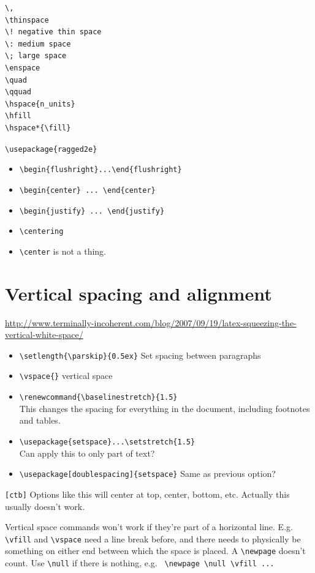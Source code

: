 \documentclass{article}
\begin{document}
\begin{verbatim}
\,
\thinspace
\! negative thin space
\: medium space
\; large space
\enspace
\quad
\qquad
\hspace{n_units}
\hfill
\hspace*{\fill}
\end{verbatim}

\verb|\usepackage{ragged2e}|
\begin{itemize}
    \item \verb|\begin{flushright}...\end{flushright}|
    \item \verb|\begin{center} ... \end{center}|
    \item \verb|\begin{justify} ... \end{justify}|
    \item \verb|\centering|
    \item \verb|\center| is not a thing.
\end{itemize}

\section{Vertical spacing and alignment}
\url{http://www.terminally-incoherent.com/blog/2007/09/19/latex-squeezing-the-vertical-white-space/}
\begin{itemize}
    \item \verb|\setlength{\parskip}{0.5ex}| Set spacing between paragraphs
    \item \verb|\vspace{}| vertical space
    \item \verb|\renewcommand{\baselinestretch}{1.5}|\\
        This changes the spacing for everything in the document,
        including footnotes and tables.
    \item \verb|\usepackage{setspace}...\setstretch{1.5}|\\
        Can apply this to only part of text?
    \item \verb|\usepackage[doublespacing]{setspace}|
        Same as previous option?
\end{itemize}
\verb|[ctb]| Options like this will center at top, center, bottom, etc.
Actually this usually doesn't work.

Vertical space commands won't work if they're part of a horizontal line.
E.g. \verb|\vfill| and \verb|\vspace| need a line break before, and there needs
to physically be something on either end between which the space is placed.
A \verb|\newpage| doesn't count. Use \verb|\null| if there is nothing, e.g.
\verb| \newpage \null \vfill ... |
\end{document}
